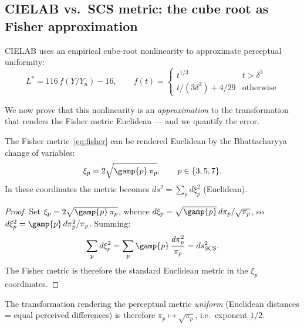 \documentclass[12pt,a4paper]{article}
\begin{document}
\subsection{CIELAB vs.\ SCS metric: the cube root as Fisher approximation}

CIELAB uses an empirical cube-root nonlinearity to approximate
perceptual uniformity:
\begin{equation}
  L^* = 116\,f(Y/Y_n) - 16, \qquad
  f(t) = \begin{cases} t^{1/3} & t > \delta^3 \\
  t/(3\delta^2) + 4/29 & \text{otherwise} \end{cases}
  \label{eq:cielab}
\end{equation}

We now prove that this nonlinearity is an \emph{approximation} to the
transformation that renders the Fisher metric Euclidean --- and we
quantify the error.

\begin{derivedbox}
The Fisher metric~\eqref{eq:fisher} can be rendered Euclidean by the
Bhattacharyya change of variables:
\begin{equation}
  \xi_p = 2\sqrt{\gamp{p}\,\pi_p}, \qquad p \in \{3, 5, 7\}.
  \label{eq:bhattacharyya}
\end{equation}
In these coordinates the metric becomes
$ds^2 = \sum_p d\xi_p^2$ (Euclidean).

\begin{proof}
Set $\xi_p = 2\sqrt{\gamp{p}\,\pi_p}$, whence
$d\xi_p = \sqrt{\gamp{p}}\,d\pi_p / \sqrt{\pi_p}$, so
$d\xi_p^2 = \gamp{p}\,d\pi_p^2 / \pi_p$. Summing:
\[
  \sum_p d\xi_p^2
  = \sum_p \gamp{p}\,\frac{d\pi_p^2}{\pi_p}
  = ds^2_{\mathrm{SCS}}.
\]
The Fisher metric is therefore the standard Euclidean metric in the
$\xi_p$ coordinates.
\end{proof}
\end{derivedbox}

The transformation rendering the perceptual metric \emph{uniform}
(Euclidean distances = equal perceived differences) is therefore
$\pi_p \mapsto \sqrt{\pi_p}$, i.e.\ exponent $1/2$.
\end{document}
